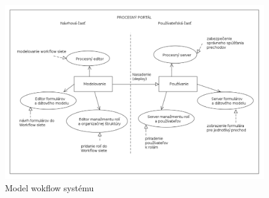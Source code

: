 	\begin{figure}[h]
		\centering
		\includegraphics[width=0.9\linewidth]{images/model_apk}
		\caption{Model wokflow systému}
		\label{fig:model_apk} 
	\end{figure}





